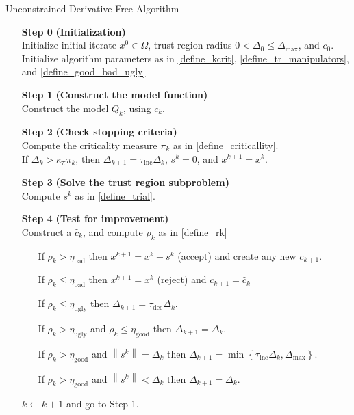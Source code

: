 \documentclass{article}
\theoremstyle{case}
\newcommand{\xk}{{x^k}}
\newcommand{\qk}{{Q_k}}
\newcommand{\ck}{{c_k}}
\newcommand{\domain}{{\Omega}}
\newcommand{\dk}{{\Delta_k}}
\newcommand{\rk}{{\rho_k}}
\newcommand{\pik}{{\pi_k}}
\newcommand{\sk}{{s^k}}
\newcommand{\xzero}{{x^{0}}}
\newcommand{\dzero}{{\Delta_{0}}}
\newcommand{\czero}{{c_{0}}}
\newcommand{\xkpo}{{x^{k+1}}}
\newcommand{\dkpo}{{\Delta_{k+1}}}
\newcommand{\ckpo}{{c_{k+1}}}
\newcommand{\ctrialk}{{\hat c_k}}
\newcommand{\kcrit}{{\kappa_{\pi}}}
\newcommand{\tinc}{{\tau_{\text{inc}}}}
\newcommand{\tdec}{{\tau_{\text{dec}}}}
\newcommand{\egood}{{\eta_{\text{good}}}}
\newcommand{\eugly}{{\eta_{\text{ugly}}}}
\newcommand{\ebad}{{\eta_{\text{bad}}}}
\newcommand{\dmax}{{\Delta_{\text{max}}}}
\begin{document}
\begin{algorithm}[H]
    \caption{Unconstrained Derivative Free Algorithm}
    \label{unconstrained_dfo}
    \begin{itemize}
        \item[\textbf{Step 0}] \textbf{(Initialization)} \\
            Initialize initial iterate $\xzero \in \domain$, trust region radius $0 < \dzero \le \dmax$, and $\czero$. \\
            Initialize algorithm parameters as in \cref{define_kcrit}, \cref{define_tr_manipulators}, and \cref{define_good_bad_ugly}
            
        \item[\textbf{Step 1}] \textbf{(Construct the model function)} \\
        	Construct the model $\qk$, using $\ck$.
        
        \item[\textbf{Step 2}] \textbf{(Check stopping criteria)} \\
            Compute the criticality measure $\pik$ as in \cref{define_criticallity}. \\
            If $\dk > \kcrit\pik$, then $\dkpo = \tinc\dk$, $\sk = 0$, and $\xkpo = \xk$.
        
        \item[\textbf{Step 3}] \textbf{(Solve the trust region subproblem)} \\
            Compute $\sk$ as in \cref{define_trial}.
            
        \item[\textbf{Step 4}] \textbf{(Test for improvement)} \\
        	Construct a $\ctrialk$, and compute $\rk$ as in \cref{define_rk}\begin{itemize}
	            \item[] If $\rk > \ebad$ then $\xkpo=\xk+\sk$ (accept) and create any new $\ckpo$.
	            \item[] If $\rk \le \ebad$ then $\xkpo=\xk$ (reject) and $\ckpo = \ctrialk$
	            \item[] If $\rk \le \eugly$ then $\dkpo = \tdec \dk$.
	            \item[] If $\rk > \eugly$ and $\rk \le \egood$ then $\dkpo = \dk$.
	            \item[] If $\rk > \egood$ and $\left\|\sk\right\| = \dk$ then $\dkpo = \min\left\{\tinc \dk, \dmax\right\}$.
	            \item[] If $\rk > \egood$ and $\left\|\sk\right\| < \dk$ then $\dkpo = \dk$.
            \end{itemize}
            $k \gets k+1$ and go to Step 1.
    \end{itemize}
\end{algorithm}
\end{document}
